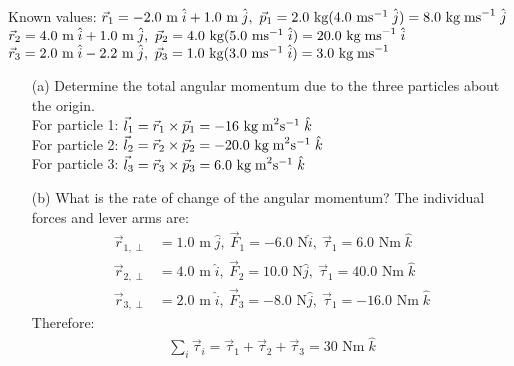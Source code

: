 \documentclass[a4paper]{article}
\newcommand\m{\text{ m}}
\newcommand\Nm{\text{ Nm}}
\newcommand\ms{\text{ ms}^{-1}}
\newcommand\kg{\text{ kg}}
\newcommand\kgms{\text{ kg\;ms}^{-1}}
\newcommand\kgmms{\text{ kg\;m}^2\text{s}^{-1}}
\begin{document}
\begin{shaded}
\begin{center}
    \end{center}
    Known values: $\vec{r}_1 = -2.0\m\;\hat{i} + 1.0\m\;\hat{j},\ \vec{p}_1 = 2.0\kg(4.0\ms\;\hat{j}) = 8.0\kgms\;\hat{j}$ \\
    \hspace*{22.7mm} $\vec{r}_2 = 4.0\m\;\hat{i} + 1.0\m\;\hat{j},\ \vec{p}_2 = 4.0\kg(5.0\ms\;\hat{i}) = 20.0\kgms\;\hat{i}$\\
    \hspace*{22.7mm} $\vec{r}_3 = 2.0\m\;\hat{i} - 2.2\m\;\hat{j},\ \vec{p}_3 = 1.0\kg(3.0\ms\;\hat{i}) = 3.0\kgms$
    \begin{enumerate}
        \item[(a)] Determine the total angular momentum due to the three particles about the origin.\\
        For particle 1: $\vec{l}_1 = \vec{r}_1 \times \vec{p}_1 = -16\kgmms\;\hat{k}$\\
        For particle 2: $\vec{l}_2 = \vec{r}_2 \times \vec{p}_2 = -20.0\kgmms\;\hat{k}$\\
        For particle 3: $\vec{l}_3 = \vec{r}_3 \times \vec{p}_3 = 6.0\kgmms\;\hat{k}$
        \item[(b)] What is the rate of change of the angular momentum?
        The individual forces and lever arms are:
        \begin{align*}
            \vec{r}_{1,\perp} &= 1.0\m\;\hat{j},\ \vec{F}_1 = -6.0\text{ N}\hat{i},\ \vec{\tau}_1 = 6.0\Nm\;\hat{k}\\
            \vec{r}_{2,\perp} &= 4.0\m\;\hat{i},\ \vec{F}_2 = 10.0\text{ N}\hat{j},\ \vec{\tau}_1 = 40.0\Nm\;\hat{k}\\
            \vec{r}_{3,\perp} &= 2.0\m\;\hat{i},\ \vec{F}_3 = -8.0\text{ N}\hat{j},\ \vec{\tau}_1 = -16.0\Nm\;\hat{k}
        \end{align*}
        Therefore:
        \begin{align*}
            \sum_{i}\vec{\tau}_i = \vec{\tau}_1 + \vec{\tau}_2 + \vec{\tau}_3 = 30\Nm\;\hat{k}
        \end{align*}
    \end{enumerate}
\end{shaded}
\newpage
\end{document}

